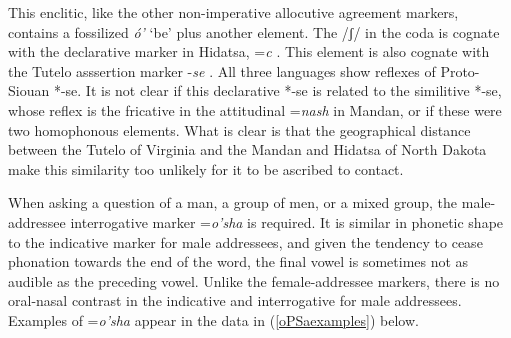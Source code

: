 This enclitic, like the other non-imperative allocutive agreement markers, contains a fossilized \textit{ó'} `be' plus another element. The /ʃ/ in the coda is cognate with the declarative marker in Hidatsa, =\textit{c} \citep[197]{boyle2007}. This element is also cognate with the Tutelo asssertion marker -\textit{se} \citep[121]{einaudi1976}. All three languages show reflexes of Proto-Siouan *-se. It is not clear if this declarative *-se is related to the similitive *-se, whose reflex is the fricative in the attitudinal =\textit{nash} in Mandan, or if these were two homophonous elements. What is clear is that the geographical distance between the Tutelo of Virginia and the Mandan and Hidatsa of North Dakota make this similarity too unlikely for it to be ascribed to contact.


When asking a question of a man, a group of men, or a mixed group, the male-addressee interrogative marker =\textit{o'sha} is required. It is similar in phonetic shape to the indicative marker for male addressees, and given the tendency to cease phonation towards the end of the word, the final vowel is sometimes not as audible as the preceding vowel. Unlike the female-addressee markers, there is no oral-nasal contrast in the indicative and interrogative for male addressees. Examples of =\textit{o'sha} appear in the data in (\ref{oPSaexamples}) below.

